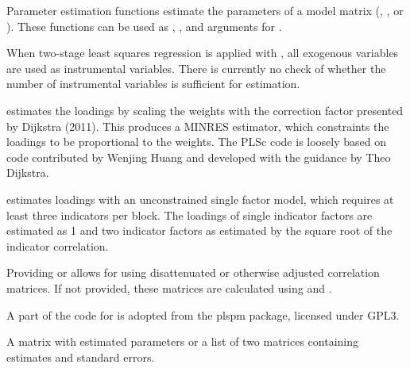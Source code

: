 \documentclass[a4paper]{book}
\begin{document}
\begin{Details}\relax
Parameter estimation functions estimate the parameters of a model matrix (,
, or ). These functions can be used as ,
, and  arguments for 
.

When two-stage least squares regression is applied with , all
exogenous variables are used as instrumental variables. There is currently no check of whether the
number of instrumental variables is sufficient for estimation.

 estimates the loadings by scaling the weights  with the
correction factor  presented by Dijkstra (2011). This produces a MINRES estimator,
which constraints the loadings to be proportional to the weights.
The PLSc code is loosely based on code contributed by Wenjing Huang and developed with the guidance
by Theo Dijkstra.

 estimates loadings with an unconstrained single factor model,
which requires at least three indicators per block. The loadings of 
single indicator factors are estimated as 1 and two indicator factors as estimated by the
square root of the indicator correlation.

Providing  or  allows for using disattenuated or otherwise
adjusted correlation matrices. If not provided, these matrices are calculated using  and
.

A part of the code for  is adopted from the plspm package, licensed
under GPL3.
\end{Details}
%
\begin{Value}
A matrix with estimated parameters or a list of two matrices containing estimates and
standard errors.
\end{Value}
%
\end{document}

